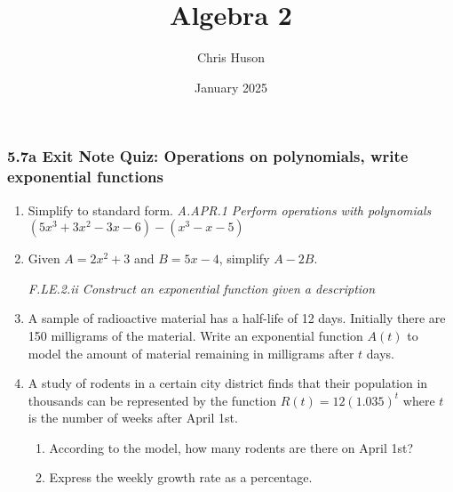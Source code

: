 \documentclass[12pt, twoside]{article}
\title{Algebra 2}
\author{Chris Huson}
\date{January 2025}
\begin{document}
\subsubsection*{5.7a Exit Note Quiz: Operations on polynomials, write exponential functions}
\begin{enumerate}

\item Simplify to standard form. \hfill \emph{A.APR.1 Perform operations with polynomials} \\[0.25cm]
$(5x^3 + 3x^2 - 3x - 6) - (x^3 - x - 5)$ \vspace{4cm}

\item Given $A = 2x^2+3$ and $B = 5x-4$, simplify $A - 2B$. \vspace{5cm}


\; \hfill \emph{F.LE.2.ii Construct an exponential function given a description}
\item A sample of radioactive material has a half-life of 12 days. Initially there are 150 milligrams of the material. Write an exponential function $A(t)$ to model the amount of material remaining in milligrams after $t$ days. \vspace{2cm}

\item A study of rodents in a certain city district finds that their population in thousands can be represented by the function $R(t) = 12(1.035)^t$ where $t$ is the number of weeks after April 1st. 
\begin{enumerate}[itemsep=1.5cm]
    \item According to the model, how many rodents are there on April 1st?
    \item Express the weekly growth rate as a percentage.
\end{enumerate}  \vspace{2cm}

\end{enumerate}


\newpage
\end{document}
